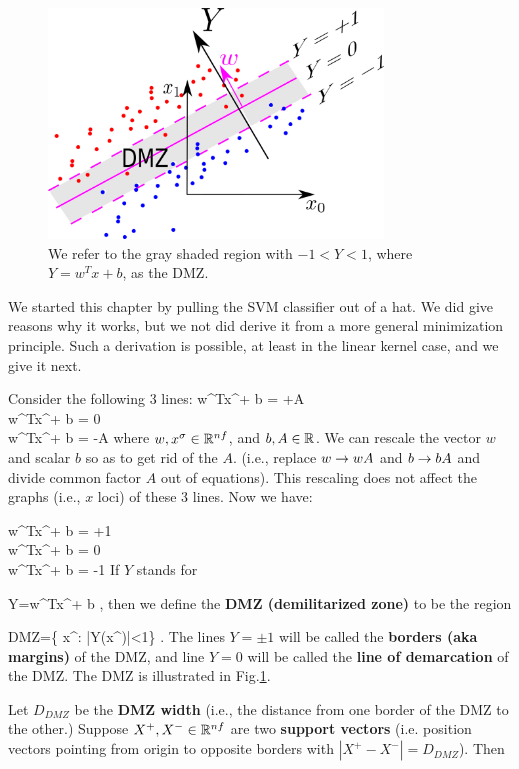\begin{figure}[h!]
\centering
\includegraphics[width=3.5in]
{svm/svm-dmz.png}
\caption{We refer to the gray shaded region
with $-1<Y<1$, where $Y= w^T x +b$,  
as the DMZ.}
\label{fig-svm-dmz}
\end{figure}

We started this
chapter by pulling the SVM classifier
out of a hat. We did give
reasons why it works, but we not did derive
it from a more general minimization
principle. Such a derivation
is possible, at least in the 
linear kernel case, and we give it next.


Consider the following 3 lines:
\beqa
w^Tx^\s + b = +A
\\
w^Tx^\s + b = 0
\\
w^Tx^\s + b = -A
\eeqa
where $w, x^\sigma\in { \mathbb{R}}^{nf}$, and $b,A\in { \mathbb{R}}$.
We can rescale the vector $w$ and 
scalar $b$ so as to get rid of the $A$.
(i.e., replace $w\rightarrow wA$ and $b\rightarrow bA$
and divide common factor $A$ out of equations).
This rescaling does not
affect the graphs (i.e., $x$ loci)
of these 3 lines. Now we have:


\beqa
w^Tx^\s + b = +1
\\
w^Tx^\s + b = 0
\\
w^Tx^\s + b = -1
\eeqa
If $Y$ stands for

\beq
Y=w^Tx^\s + b
\;,
\eeq
then we define
the {\bf DMZ (demilitarized zone)}
to be the region 

\beq
DMZ=\{  x^\s: |Y(x^\s)|<1\}
\;.
\eeq
The lines $Y=\pm 1$
will be called the {\bf borders (aka margins)}
of the DMZ, and 
line $Y=0$
will be called the
{\bf line of demarcation}
of the DMZ.
The DMZ is illustrated in Fig.\ref{fig-svm-dmz}.

Let $D_{DMZ}$ be
the {\bf DMZ width} (i.e., 
the distance from one border
of the DMZ to the other.)
Suppose $X^+, X^-\in { \mathbb{R}}^{nf}$
are two {\bf support vectors}
(i.e. position vectors pointing 
from origin to opposite borders
with $|X^+-X^-|=D_{DMZ}$). Then 

